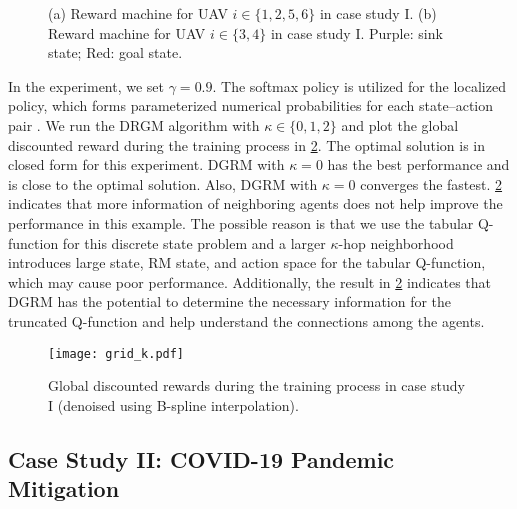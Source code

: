 \documentclass[conf]{new-aiaa}
\def\foo ABC{DGRM}
\begin{document}
\begin{figure}[hbt!]
    \centering
    \hspace{1cm}
    \caption{(a) Reward machine for UAV $i\in \{1,2,5,6 \}$ in case study I. (b) Reward machine for UAV $i\in \{3, 4 \}$ in case study I. Purple: sink state; Red: goal state.}
    \label{RM_grid}
\end{figure}


In the experiment, we set $\gamma=0.9$. The softmax policy is utilized for the localized policy, which forms parameterized numerical probabilities for each state–action pair \cite{sutton2018reinforcement}. We run the DRGM algorithm with $\kappa \in \{0, 1, 2\}$ and plot the global discounted reward during the training process in \cref{grid_k}. The optimal solution is in closed form for this experiment. \foo ABC with $\kappa = 0$ has the best performance and is close to the optimal solution. Also, \foo ABC with $\kappa = 0$ converges the fastest. \cref{grid_k} indicates that more information of neighboring agents does not help improve the performance in this example. The possible reason is that we use the tabular Q-function for this discrete state problem and a larger $\kappa$-hop neighborhood introduces large state, RM state, and action space for the tabular Q-function, which may cause poor performance. Additionally, the result in \cref{grid_k} indicates that \foo ABC has the potential to determine the necessary information for the truncated Q-function and help understand the connections among the agents. 


\begin{figure}[t]
\centering
\texttt{[image: grid\_k.pdf]}
\caption{Global discounted rewards during the training process in case study I (denoised using B-spline interpolation).}
\label{grid_k}
\end{figure}



\subsection{Case Study II: COVID-19 Pandemic Mitigation}
 
\end{document}
